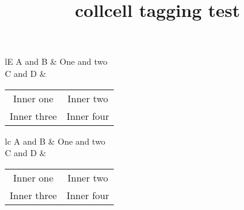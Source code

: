 \documentclass{article}
\title{collcell tagging test}
\begin{document}
\begin{tabular}{lE}
A and B & One and two \\
C and D &
{\begin{tabular}{cc} %
Inner one & Inner two \\
Inner three & Inner four
\end{tabular}}
\end{tabular}

\begin{tabular}{lc}
A and B & One and two \\
C and D &
\begin{tabular}{cc}
Inner one & Inner two \\
Inner three & Inner four
\end{tabular}
\end{tabular}
\end{document}
